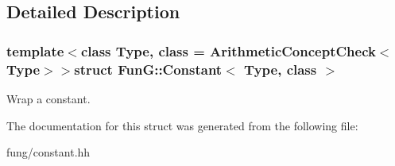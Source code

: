 \subsection{Detailed Description}
\subsubsection*{template$<$class Type, class = Arithmetic\-Concept\-Check$<$\-Type$>$$>$struct Fun\-G\-::\-Constant$<$ Type, class $>$}

Wrap a constant. 

The documentation for this struct was generated from the following file\-:\begin{DoxyCompactItemize}
\item 
fung/constant.\-hh\end{DoxyCompactItemize}
